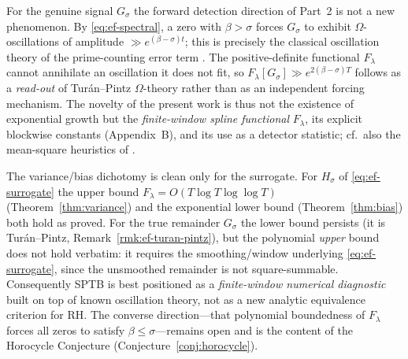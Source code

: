 \begin{remark}\label{rmk:ef-turan-pintz}
For the genuine signal $G_\sigma$ the forward detection direction of Part~2 is
not a new phenomenon. By \eqref{eq:ef-spectral}, a zero with $\beta>\sigma$
forces $G_\sigma$ to exhibit $\Omega$-oscillations of amplitude
$\gg e^{(\beta-\sigma)t}$; this is precisely the classical oscillation theory
of the prime-counting error term \cite{turan-pintz,ingham}. The
positive-definite functional $F_\lambda$ cannot annihilate an oscillation it
does not fit, so $F_\lambda[G_\sigma]\gg e^{2(\beta-\sigma)T}$ follows as a
\emph{read-out} of Tur\'an--Pintz $\Omega$-theory rather than as an independent
forcing mechanism. The novelty of the present work is thus not the existence of
exponential growth but the \emph{finite-window spline functional}
$F_\lambda$, its explicit blockwise constants (Appendix~B), and its use as a
detector statistic; cf.\ also the mean-square heuristics of
\cite{baezduarte,montgomery-pair}.
\end{remark}

\begin{remark}\label{rmk:ef-scope}
The variance/bias dichotomy is clean only for the surrogate. For $H_\sigma$ of
\eqref{eq:ef-surrogate} the upper bound $F_\lambda=O(T\log T\log\log T)$
(Theorem~\ref{thm:variance}) and the exponential lower bound
(Theorem~\ref{thm:bias}) both hold as proved. For the true remainder $G_\sigma$
the lower bound persists (it is Tur\'an--Pintz, Remark~\ref{rmk:ef-turan-pintz}),
but the polynomial \emph{upper} bound does not hold verbatim: it requires the
smoothing/window underlying \eqref{eq:ef-surrogate}, since the unsmoothed
remainder is not square-summable. Consequently SPTB is best positioned as a
\emph{finite-window numerical diagnostic} built on top of known oscillation
theory, not as a new analytic equivalence criterion for RH. The converse
direction---that polynomial boundedness of $F_\lambda$ forces all zeros to
satisfy $\beta\le\sigma$---remains open and is the content of the Horocycle
Conjecture (Conjecture~\ref{conj:horocycle}).
\end{remark}
